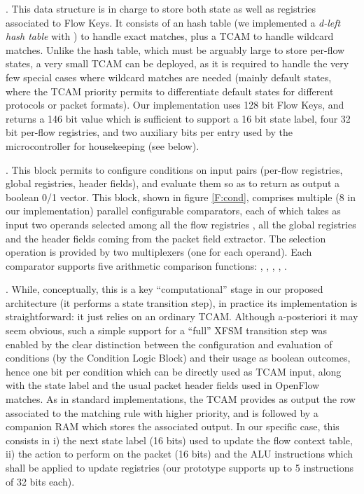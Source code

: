 \documentclass{sig-alternate}
\begin{document}
\vspace{3pt} . This data structure is in charge to store both state as well as registries associated to Flow Keys. It consists of an hash table (we implemented a  {\em d-left hash table} with ) to handle exact matches, plus a TCAM to handle wildcard matches. Unlike the hash table, which must be arguably large to store per-flow states, a very small TCAM can be deployed, as it is required to handle the very few special cases where wildcard matches are needed (mainly default states, where the TCAM priority permits to differentiate default states for different protocols or packet formats). Our implementation uses 128 bit Flow Keys, and returns a 146 bit value which is sufficient to support a 16 bit state label, four 32 bit per-flow registries, and two auxiliary bits per entry used by the microcontroller for housekeeping (see below). 

\vspace{3pt} . This block permits to configure conditions on input pairs (per-flow registries, global registries, header fields), and evaluate them so as to return as output a boolean 0/1 vector. This block, shown in figure \ref{F:cond}, comprises multiple (8 in our implementation) parallel configurable comparators, each of which takes as input two operands selected among all the flow registries , all the global registries  and the header fields  coming from the packet field extractor. The selection operation is provided by two multiplexers (one for each operand). Each comparator supports five arithmetic comparison functions: , , , , .

\vspace{3pt} . While, conceptually, this is a key ``computational'' stage in our proposed architecture (it performs a state transition step), in practice its implementation is straightforward: it just relies on an ordinary TCAM. Although a-posteriori it may seem obvious, such a simple support for a ``full'' XFSM transition step was enabled by the clear distinction between the configuration and evaluation of conditions (by the Condition Logic Block) and their usage as boolean outcomes, hence one bit per condition which can be directly used as TCAM input, along with the state label and the usual packet header fields used in OpenFlow matches. As in standard implementations, the TCAM provides as output the row associated to the matching rule with higher priority, and is followed by a companion RAM which stores the associated output. In our specific case, this consists in i) the next state label (16 bits) used to update the flow context table, ii) the action to perform on the packet (16 bits) and the ALU  instructions which shall be applied to update registries (our prototype supports up to 5 instructions of 32 bits each).
\end{document}
